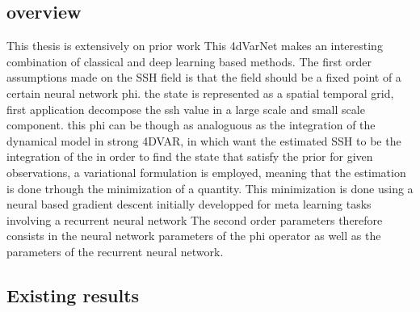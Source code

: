 \begin{bibunit}
  \subsection{overview}
This thesis is extensively on prior work 
This 4dVarNet makes an interesting combination of classical and deep learning based methods.
The first order assumptions made on the SSH field is that the field should be a fixed point of a certain neural network phi.
the state is represented as a spatial temporal grid, first application decompose the ssh value in a large scale and small scale component.
this phi can be though as analoguous as the integration of the dynamical model in strong 4DVAR, in which want the estimated SSH to be the integration of the 
in order to find the state that satisfy the prior for given observations, a variational formulation is employed,
  meaning that the estimation is done trhough the minimization of a quantity.
  This minimization is done using a neural based gradient descent initially developped for meta learning tasks involving a recurrent neural network
  The second order parameters therefore consists in the neural network parameters of the phi operator as well as the parameters of the recurrent neural network.

\subsection{Existing results}





\end{bibunit}
